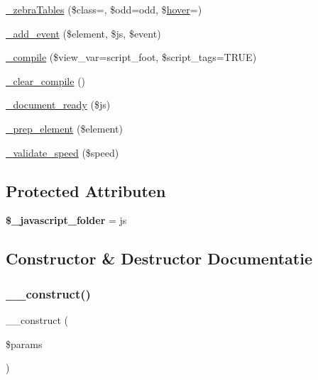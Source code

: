\begin{DoxyCompactItemize}
\item 
\mbox{\hyperlink{class_c_i___jquery_ac3aee12f47604782c9999a511d3ea4e5}{\+\_\+zebra\+Tables}} (\$class=\textquotesingle{}\textquotesingle{}, \$odd=\textquotesingle{}odd\textquotesingle{}, \$\mbox{\hyperlink{class_c_i___javascript_a6f8cfdbca8f6b2c2d68bb9a38a8f96a7}{hover}}=\textquotesingle{}\textquotesingle{})
\item 
\mbox{\hyperlink{class_c_i___jquery_acb1530e106b7717d7c031dcb082a0da8}{\+\_\+add\+\_\+event}} (\$element, \$js, \$event)
\item 
\mbox{\hyperlink{class_c_i___jquery_a32374487ab27bcad0bee1bf18a6e6b7a}{\+\_\+compile}} (\$view\+\_\+var=\textquotesingle{}script\+\_\+foot\textquotesingle{}, \$script\+\_\+tags=T\+R\+UE)
\item 
\mbox{\hyperlink{class_c_i___jquery_a8508147ee3b37f58e7c58f365c6c1409}{\+\_\+clear\+\_\+compile}} ()
\item 
\mbox{\hyperlink{class_c_i___jquery_a5d111acaf02096fa67c90954167c202f}{\+\_\+document\+\_\+ready}} (\$js)
\item 
\mbox{\hyperlink{class_c_i___jquery_a6dd4fcc0640975784e69d1ea11eba291}{\+\_\+prep\+\_\+element}} (\$element)
\item 
\mbox{\hyperlink{class_c_i___jquery_aea8d69840297d111305f7b5ff9982573}{\+\_\+validate\+\_\+speed}} (\$speed)
\end{DoxyCompactItemize}
\subsection*{Protected Attributen}
\begin{DoxyCompactItemize}
\item 
\mbox{\label{class_c_i___jquery_a078b6ad01e6de9b28c6ff3afa31c55db}} 
{\bfseries \$\+\_\+javascript\+\_\+folder} = \textquotesingle{}js\textquotesingle{}
\end{DoxyCompactItemize}


\subsection{Constructor \& Destructor Documentatie}
\mbox{\label{class_c_i___jquery_a9162320adff1a1a4afd7f2372f753a3e}} 
\subsubsection{\texorpdfstring{\_\_construct()}{\_\_construct()}}
{\footnotesize\ttfamily \+\_\+\+\_\+construct (\begin{DoxyParamCaption}\item[{}]{\$params }\end{DoxyParamCaption})}

